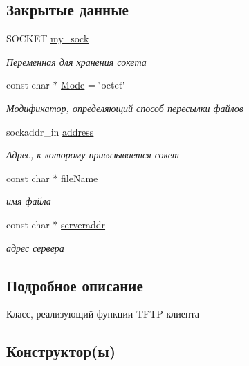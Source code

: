\subsection*{Закрытые данные}
\begin{DoxyCompactItemize}
\item 
S\+O\+C\+K\+ET \mbox{\hyperlink{classclient_af08b371e5f63b6e3b31481bd78116c05}{my\+\_\+sock}}
\begin{DoxyCompactList}\small\item\em Переменная для хранения сокета \end{DoxyCompactList}\item 
const char $\ast$ \mbox{\hyperlink{classclient_a6344c796d8938bb50204ae910e8e6ca5}{Mode}} = \char`\"{}octet\char`\"{}
\begin{DoxyCompactList}\small\item\em Модификатор, определяющий способ пересылки файлов \end{DoxyCompactList}\item 
sockaddr\+\_\+in \mbox{\hyperlink{classclient_aa4de3c44504f7d2de8e9a4528d52f9e6}{address}}
\begin{DoxyCompactList}\small\item\em Адрес, к которому привязывается сокет \end{DoxyCompactList}\item 
const char $\ast$ \mbox{\hyperlink{classclient_a5287cc97b0640684ac8e1d7e5eca344d}{file\+Name}}
\begin{DoxyCompactList}\small\item\em имя файла \end{DoxyCompactList}\item 
const char $\ast$ \mbox{\hyperlink{classclient_a0e6ff51f62b6a053856cbdbe48408998}{serveraddr}}
\begin{DoxyCompactList}\small\item\em адрес сервера \end{DoxyCompactList}\end{DoxyCompactItemize}


\subsection{Подробное описание}
Класс, реализующий функции T\+F\+TP клиента 

\subsection{Конструктор(ы)}
\mbox{\label{classclient_a4bc79734708aae7d9017d03a62b5d324}} 
